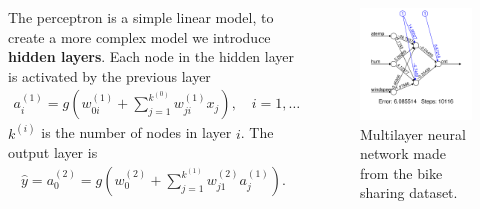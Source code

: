 \documentclass[aspectratio=169,10pt]{beamer}
\begin{document}
\begin{frame}{\secname}{\subsecname}
  \begin{columns}
    \begin{column}{.6\textwidth}
      The perceptron is a simple linear model, to create a more complex model we introduce \textbf{hidden layers}.
      Each node in the hidden layer is activated by the previous layer
      \begin{align}
        a_i^{(1)} = g\left(w_{0i}^{(1)} + \sum_{j=1}^{k^{(0)}}w_{ji}^{(1)}x_j\right), \quad i = 1,\ldots,k^{(1)}.
      \end{align}
      $k^{(i)}$ is the number of nodes in layer $i$.
      The output layer is
      {\small
      \begin{align}
        \hat{y} = a_0^{(2)} = g\left(w_{0}^{(2)} + \sum_{j=1}^{k^{(1)}}w_{j1}^{(2)}a_j^{(1)}\right).
      \end{align}
      }
    \end{column}
    \begin{column}{.4\textwidth}
      \begin{figure}
        \includegraphics[width=.9\textwidth]{scripts/output/neural_network_multilayer.pdf}
        \caption{Multilayer neural network made from the bike sharing dataset.}
      \end{figure}
    \end{column}
  \end{columns}
\end{frame}
\end{document}
